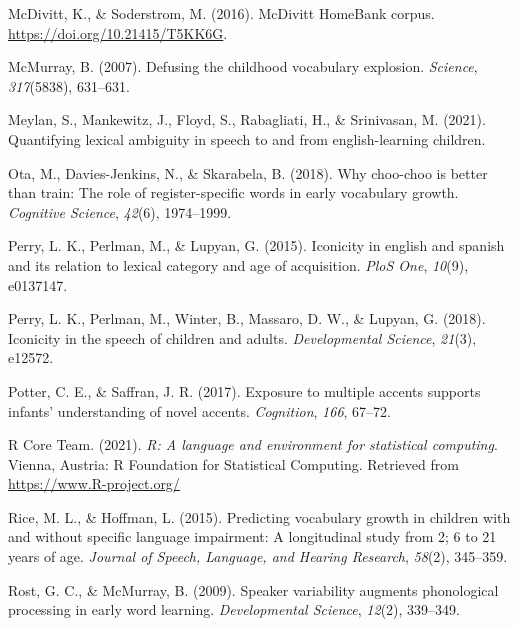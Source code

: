 \documentclass[10pt, letterpaper]{article}
\newenvironment{CSLReferences}%
  {}%
  {\par}
\begin{document}
\begin{CSLReferences}{1}{0}
\leavevmode\hypertarget{ref-soderstromcorpus}{}%
McDivitt, K., \& Soderstrom, M. (2016). McDivitt HomeBank corpus.
\url{https://doi.org/10.21415/T5KK6G}.

\leavevmode\hypertarget{ref-mcmurray2007defusing}{}%
McMurray, B. (2007). Defusing the childhood vocabulary explosion.
\emph{Science}, \emph{317}(5838), 631--631.

\leavevmode\hypertarget{ref-meylan2021quantifying}{}%
Meylan, S., Mankewitz, J., Floyd, S., Rabagliati, H., \& Srinivasan, M.
(2021). Quantifying lexical ambiguity in speech to and from
english-learning children.

\leavevmode\hypertarget{ref-ota2018choo}{}%
Ota, M., Davies-Jenkins, N., \& Skarabela, B. (2018). Why choo-choo is
better than train: The role of register-specific words in early
vocabulary growth. \emph{Cognitive Science}, \emph{42}(6), 1974--1999.

\leavevmode\hypertarget{ref-perry2015iconicity}{}%
Perry, L. K., Perlman, M., \& Lupyan, G. (2015). Iconicity in english
and spanish and its relation to lexical category and age of acquisition.
\emph{PloS One}, \emph{10}(9), e0137147.

\leavevmode\hypertarget{ref-perry2018iconicity}{}%
Perry, L. K., Perlman, M., Winter, B., Massaro, D. W., \& Lupyan, G.
(2018). Iconicity in the speech of children and adults.
\emph{Developmental Science}, \emph{21}(3), e12572.

\leavevmode\hypertarget{ref-potter2017exposure}{}%
Potter, C. E., \& Saffran, J. R. (2017). Exposure to multiple accents
supports infants' understanding of novel accents. \emph{Cognition},
\emph{166}, 67--72.

\leavevmode\hypertarget{ref-r2021}{}%
R Core Team. (2021). \emph{R: A language and environment for statistical
computing}. Vienna, Austria: R Foundation for Statistical Computing.
Retrieved from \url{https://www.R-project.org/}

\leavevmode\hypertarget{ref-rice2015predicting}{}%
Rice, M. L., \& Hoffman, L. (2015). Predicting vocabulary growth in
children with and without specific language impairment: A longitudinal
study from 2; 6 to 21 years of age. \emph{Journal of Speech, Language,
and Hearing Research}, \emph{58}(2), 345--359.

\leavevmode\hypertarget{ref-rost2009speaker}{}%
Rost, G. C., \& McMurray, B. (2009). Speaker variability augments
phonological processing in early word learning. \emph{Developmental
Science}, \emph{12}(2), 339--349.


\end{CSLReferences}
\end{document}
